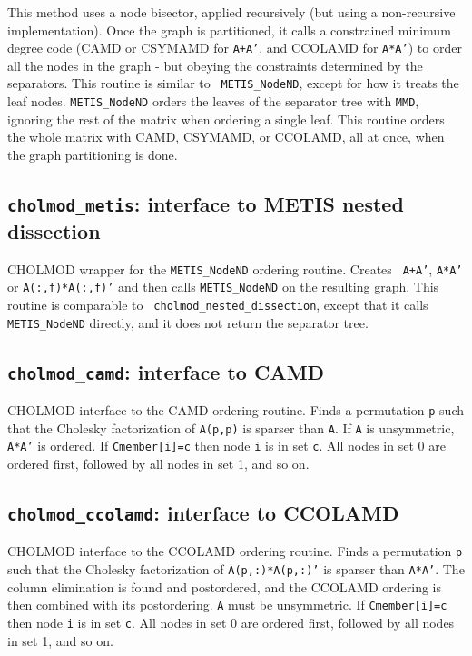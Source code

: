 \documentclass[11pt]{article}
\begin{document}
This method uses a node bisector, applied recursively (but using a
non-recursive implementation).  Once the graph is partitioned, it calls a
constrained minimum degree code (CAMD or CSYMAMD for {\tt A+A'}, and CCOLAMD
for {\tt A*A'}) to order all the nodes in the graph - but obeying the
constraints determined by the separators.  This routine is similar to {\tt
METIS\_NodeND}, except for how it treats the leaf nodes.  {\tt METIS\_NodeND}
orders the leaves of the separator tree with {\tt MMD}, ignoring the rest of
the matrix when ordering a single leaf.  This routine orders the whole matrix
with CAMD, CSYMAMD, or CCOLAMD, all at once, when the graph partitioning is
done.

\subsection{{\tt cholmod\_metis}: interface to METIS nested dissection}


CHOLMOD wrapper for the {\tt METIS\_NodeND} ordering routine.  Creates {\tt
A+A'}, {\tt A*A'} or {\tt A(:,f)*A(:,f)'} and then calls {\tt METIS\_NodeND} on
the resulting graph.  This routine is comparable to {\tt
cholmod\_nested\_dissection}, except that it calls {\tt METIS\_NodeND}
directly, and it does not return the separator tree.

\subsection{{\tt cholmod\_camd}: interface to CAMD}


CHOLMOD interface to the CAMD ordering routine.  Finds a permutation {\tt p}
such that the Cholesky factorization of {\tt A(p,p)} is sparser than {\tt A}.
If {\tt A} is unsymmetric, {\tt A*A'} is ordered.  If {\tt Cmember[i]=c} then
node {\tt i} is in set {\tt c}.  All nodes in set 0 are ordered first, followed
by all nodes in set 1, and so on.

\subsection{{\tt cholmod\_ccolamd}: interface to CCOLAMD}


CHOLMOD interface to the CCOLAMD ordering routine.  Finds a permutation {\tt p}
such that the Cholesky factorization of {\tt A(p,:)*A(p,:)'} is sparser than
{\tt A*A'}.  The column elimination is found and postordered, and the CCOLAMD
ordering is then combined with its postordering.  {\tt A} must be unsymmetric.
If {\tt Cmember[i]=c} then node {\tt i} is in set {\tt c}.  All nodes in set 0
are ordered first, followed by all nodes in set 1, and so on.
\end{document}
